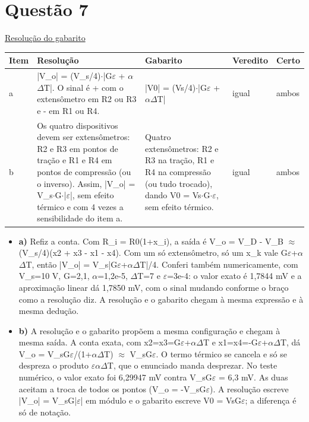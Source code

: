 \documentclass{article}%
\begin{document}
\section*{Questão 7}%
\href{https://poliedroresolve.sistemapoliedro.com.br/vestibulares/ita/2027/ita-2-fase-dia-3-22-10-2026-2-fase-dia-3/dissertativa-7-fisica-2-fase-dia-3-ita-2027}{Resolução do gabarito}\par\smallskip%
\begin{longtable}{@{}p{} p{} p{} p{} p{}@{}}\toprule Item & Resolução & Gabarito & Veredito & Certo \\ \midrule
a & |V\_o| = (V\_s/4)$\cdot$|G$\varepsilon$ + $\alpha$$\Delta$T|. O sinal é + com o extensômetro em R2 ou R3 e - em R1 ou R4. & |V0| = (Vs/4)$\cdot$|G$\varepsilon$ + $\alpha$$\Delta$T| & igual & ambos \\
b & Os quatro dispositivos devem ser extensômetros: R2 e R3 em pontos de tração e R1 e R4 em pontos de compressão (ou o inverso). Assim, |V\_o| = V\_s$\cdot$G$\cdot$|$\varepsilon$|, sem efeito térmico e com 4 vezes a sensibilidade do item a. & Quatro extensômetros: R2 e R3 na tração, R1 e R4 na compressão (ou tudo trocado), dando V0 = Vs$\cdot$G$\cdot$$\varepsilon$, sem efeito térmico. & igual & ambos \\
\bottomrule\end{longtable}%
\begin{itemize}%
\item%
\textbf{a)} Refiz a conta. Com R\_i = R0(1+x\_i), a saída é V\_o = V\_D - V\_B $\approx$ (V\_s/4)(x2 + x3 - x1 - x4). Com um só extensômetro, só um x\_k vale G$\varepsilon$+$\alpha$$\Delta$T, então |V\_o| = V\_s|G$\varepsilon$+$\alpha$$\Delta$T|/4. Conferi também numericamente, com V\_s=10 V, G=2,1, $\alpha$=1,2e{-}5, $\Delta$T=7 e $\varepsilon$=3e{-}4: o valor exato é 1,7844 mV e a aproximação linear dá 1,7850 mV, com o sinal mudando conforme o braço como a resolução diz. A resolução e o gabarito chegam à mesma expressão e à mesma dedução.%
\item%
\textbf{b)} A resolução e o gabarito propõem a mesma configuração e chegam à mesma saída. A conta exata, com x2=x3=G$\varepsilon$+$\alpha$$\Delta$T e x1=x4=-G$\varepsilon$+$\alpha$$\Delta$T, dá V\_o = V\_sG$\varepsilon$/(1+$\alpha$$\Delta$T) $\approx$ V\_sG$\varepsilon$. O termo térmico se cancela e só se despreza o produto $\varepsilon$$\alpha$$\Delta$T, que o enunciado manda desprezar. No teste numérico, o valor exato foi 6,29947 mV contra V\_sG$\varepsilon$ = 6,3 mV. As duas aceitam a troca de todos os pontos (V\_o = -V\_sG$\varepsilon$). A resolução escreve |V\_o| = V\_sG|$\varepsilon$| em módulo e o gabarito escreve V0 = VsG$\varepsilon$; a diferença é só de notação.%
\end{itemize}%
\end{document}

